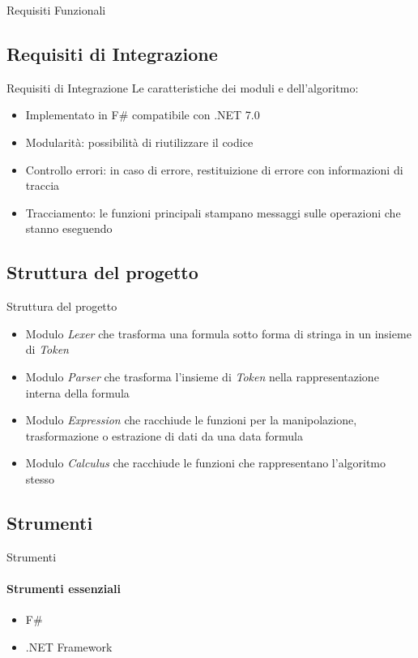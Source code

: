 \documentclass{beamer}
\begin{document}
\begin{darkframes}
\begin{frame}{Requisiti Funzionali}
    \end{frame}

    \subsection{Requisiti di Integrazione}
    \begin{frame}{Requisiti di Integrazione}
        Le caratteristiche dei moduli e dell'algoritmo:
        \begin{itemize}
            \item Implementato in F\# compatibile con .NET 7.0
            \item Modularità: possibilità di riutilizzare il codice
            \item Controllo errori: in caso di errore, restituizione di errore con informazioni di traccia
            \item Tracciamento: le funzioni principali stampano messaggi sulle operazioni che stanno eseguendo
        \end{itemize}
    \end{frame}

    \subsection{Struttura del progetto}
    \begin{frame}{Struttura del progetto}
        \begin{itemize}
            \item Modulo \textit{Lexer} che trasforma una formula sotto forma di stringa in un insieme di \textit{Token}
            \item Modulo \textit{Parser} che trasforma l'insieme di \textit{Token} nella rappresentazione interna della formula
            \item Modulo \textit{Expression} che racchiude le funzioni per la manipolazione, trasformazione o estrazione di dati da una data formula
            \item Modulo \textit{Calculus} che racchiude le funzioni che rappresentano l'algoritmo stesso
        \end{itemize}
    \end{frame}

    \subsection{Strumenti}
    \begin{frame}{Strumenti}
        \framesubtitle{Strumenti essenziali}
        \begin{itemize}
            \item F\#
            \item .NET Framework
        \end{itemize}
    \end{frame}


\end{darkframes}
\end{document}
